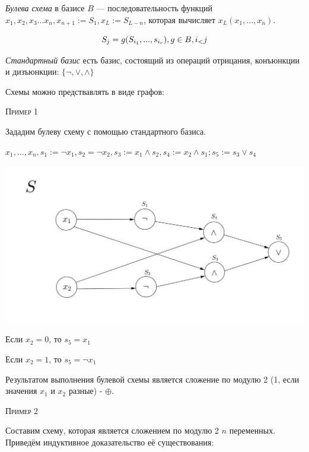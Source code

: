 \textit{Булева схема} в базисе $B$  --- последовательность функций $x_1, x_2, x_3... x_n, x_{n+1} := S_1, x_L := S_{L-n}$, которая вычисляет $x_L(x_1, \ldots ,x_n)$. 

\[S_j = g(S_{i_1},  ... , s_{i_r}), g \in B, i_\mathalpha < j\]

\textit{Стандартный базис} есть базис, состоящий из операций отрицания, конъюнкции и дизъюнкции: $\{\lnot, \vee, \wedge\}$

Схемы можно предствавлять в виде графов:

\textsc{Пример 1}

Зададим булеву схему с помощью стандартного базиса.

$x_1, \ldots ,x_n, s_1 := \lnot x_1, s_2 = \lnot x_2, s_3 := x_1 \wedge s_2, s_4 := x_2 \wedge s_1; s_5 := s_3 \vee s_4$

\includegraphics[height=7cm]{images/1.png}

Если $x_2 = 0$, то $s_5 = x_1$

Если $x_2 = 1$, то $s_5 = \lnot x_1$

Результатом выполнения булевой схемы является сложение по модулю 2 (1, если значения $x_1$ и $x_2$ разные) - $\oplus$.

\textsc{Пример 2}

Составим схему, которая является сложением по модулю 2 $n$ переменных. Приведём индуктивное доказательство её существования: 

